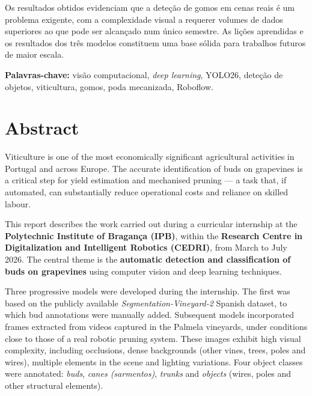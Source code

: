 Os resultados obtidos evidenciam que a deteção de gomos em cenas reais
é um problema exigente, com a complexidade visual a requerer volumes de
dados superiores ao que pode ser alcançado num único semestre. As lições
aprendidas e os resultados dos três modelos constituem uma base sólida
para trabalhos futuros de maior escala.

\vspace{1em}
\noindent\textbf{Palavras-chave:} visão computacional, \textit{deep learning},
YOLO26, deteção de objetos, viticultura, gomos, poda mecanizada, Roboflow.

\clearpage

\chapter*{Abstract}

Viticulture is one of the most economically significant agricultural activities
in Portugal and across Europe. The accurate identification of buds on
grapevines is a critical step for yield estimation and mechanised pruning —
a task that, if automated, can substantially reduce operational costs and
reliance on skilled labour.

This report describes the work carried out during a curricular internship at
the \textbf{Polytechnic Institute of Bragança (IPB)}, within the \textbf{Research
Centre in Digitalization and Intelligent Robotics (CEDRI)}, from March to
July 2026. The central theme is the \textbf{automatic detection and
classification of buds on grapevines} using computer vision and deep learning
techniques.

Three progressive models were developed during the internship. The first was
based on the publicly available \textit{Segmentation-Vineyard-2} Spanish
dataset, to which bud annotations were manually added. Subsequent models
incorporated frames extracted from videos captured in the Palmela vineyards,
under conditions close to those of a real robotic pruning system.
These images exhibit high visual complexity, including occlusions, dense
backgrounds (other vines, trees, poles and wires), multiple elements in the
scene and lighting variations. Four object classes were annotated:
\textit{buds}, \textit{canes (sarmentos)}, \textit{trunks}
and \textit{objects} (wires, poles and other structural elements).

